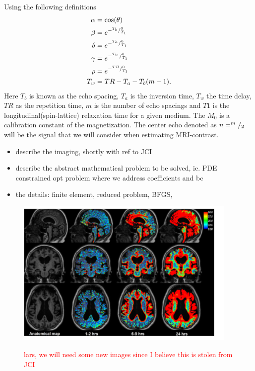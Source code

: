 \documentclass[11pt,a4paper]{article}
\renewcommand{\comment}[1]{\textcolor{red}{#1}}
\begin{document}
Using the following definitions
\begin{equation}
\begin{aligned}
\alpha &= \cos ( \theta ) \\
\beta  &= e\sp{- \sp{T_b}/_{T_1}\sp{0} } \\
\delta &= e\sp{- \sp{T_a}/_{T_1}\sp{0} } \\
\gamma &= e\sp{- \sp{T_w}/_{T_1}\sp{0} } \\
\rho   &= e\sp{- \sp{TR}/_{T_1}\sp{0} }  \\
T_w    &= TR - T_a -T_b(m-1)       .\\
\end{aligned}
\end{equation}
Here $T_b$ is known as the echo spacing, $T_a$ is the inversion time, $T_w$ the time delay, $TR$ as the repetition time, $m$ is the number of echo spacings and $T1$ is the longitudinal(spin-lattice) relaxation time for a given medium. The $M_0$ is a calibration constant of the magnetization. The center echo denoted as $n=\sp{m}/_2$ will be the signal that we will consider when estimating MRI-contrast.



 

\begin{itemize}
\item describe the imaging, shortly with ref to JCI  
\item describe the abstract mathematical problem to be solved, ie. PDE constrained opt problem where we 
address coefficients and bc  
\item the details: finite element, reduced problem, BFGS,  
\end{itemize}

\begin{figure}
\includegraphics[width=0.95\textwidth]{GMRI.png} 
\label{fig1} 
\caption{\comment{lars, we will need some new images since I believe this is stolen from JCI}}
\end{figure}
\end{document}
